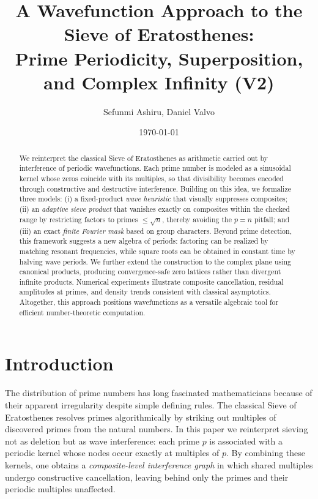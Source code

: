 \documentclass[12pt]{article}
\title{A Wavefunction Approach to the Sieve of Eratosthenes:\\
Prime Periodicity, Superposition, and Complex Infinity (V2)}
\author{Sefunmi Ashiru, Daniel Valvo}
\date{\today}
\theoremstyle{definition}
\theoremstyle{remark}
\begin{document}
\maketitle

\begin{abstract}
We reinterpret the classical Sieve of Eratosthenes as arithmetic carried out by interference of periodic wavefunctions. Each prime number is modeled as a sinusoidal kernel whose zeros coincide with its multiples, so that divisibility becomes encoded through constructive and destructive interference. Building on this idea, we formalize three models: (i) a fixed-product \emph{wave heuristic} that visually suppresses composites; (ii) an \emph{adaptive sieve product} that vanishes exactly on composites within the checked range by restricting factors to primes $\le \sqrt{n}$, thereby avoiding the $p=n$ pitfall; and (iii) an exact \emph{finite Fourier mask} based on group characters. Beyond prime detection, this framework suggests a new algebra of periods: factoring can be realized by matching resonant frequencies, while square roots can be obtained in constant time by halving wave periods. We further extend the construction to the complex plane using canonical products, producing convergence-safe zero lattices rather than divergent infinite products. Numerical experiments illustrate composite cancellation, residual amplitudes at primes, and density trends consistent with classical asymptotics. Altogether, this approach positions wavefunctions as a versatile algebraic tool for efficient number-theoretic computation.
\end{abstract}

\tableofcontents
\newpage

\section{Introduction}

The distribution of prime numbers has long fascinated mathematicians because of their apparent irregularity despite simple defining rules. The classical Sieve of Eratosthenes resolves primes algorithmically by striking out multiples of discovered primes from the natural numbers. In this paper we reinterpret sieving not as deletion but as wave interference: each prime \(p\) is associated with a periodic kernel whose nodes occur exactly at multiples of \(p\). By combining these kernels, one obtains a \emph{composite-level interference graph} in which shared multiples undergo constructive cancellation, leaving behind only the primes and their periodic multiples unaffected.
\end{document}
